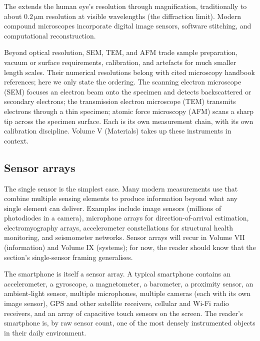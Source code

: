 The  extends the human eye's resolution
through magnification, traditionally to about $0.2 \,\si{\micro
\meter}$ resolution at visible wavelengths (the diffraction limit).
Modern compound microscopes incorporate digital image sensors,
software stitching, and computational reconstruction.

Beyond optical resolution, SEM, TEM, and AFM trade sample
preparation, vacuum or surface requirements, calibration, and
artefacts for much smaller length scales. Their numerical
resolutions belong with cited microscopy handbook references; here
we only state the ordering. The scanning electron microscope (SEM)
focuses an electron beam onto the specimen and detects backscattered
or secondary electrons; the transmission electron microscope (TEM)
transmits electrons through a thin specimen; atomic force
microscopy (AFM) scans a sharp tip across the specimen surface.
Each is its own measurement chain, with its own calibration
discipline. Volume V (Materials) takes up these instruments in
context.

\subsection{Sensor arrays}

The single sensor is the simplest case. Many modern measurements
use  that combine multiple sensing elements
to produce information beyond what any single element can deliver.
Examples include image sensors (millions of photodiodes in a
camera), microphone arrays for direction-of-arrival estimation,
electromyography arrays, accelerometer constellations for
structural health monitoring, and seismometer networks. Sensor
arrays will recur in Volume VII (information) and Volume IX
(systems); for now, the reader should know that the section's
single-sensor framing generalises.

The smartphone is itself a sensor array. A typical smartphone
contains an accelerometer, a gyroscope, a magnetometer, a
barometer, a proximity sensor, an ambient-light sensor, multiple
microphones, multiple cameras (each with its own image sensor),
GPS and other satellite receivers, cellular and Wi-Fi radio
receivers, and an array of capacitive touch sensors on the screen.
The reader's smartphone is, by raw sensor count, one of the most
densely instrumented objects in their daily environment.

